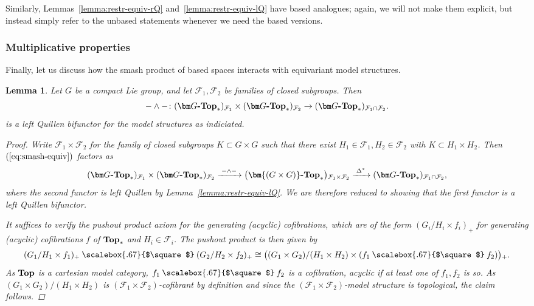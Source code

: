 \documentclass[reqno]{memo-l}
\theoremstyle{mythm}
\newtheorem{lemma}[thm]{Lemma}
\theoremstyle{definition}
\numberwithin{equation}{section}
\newcommand{\Ff}{{\mathcal{F}}}
\newcommand{\ppo}{\mathbin{\raise.25pt\hbox{\scalebox{.67}{$\square$}}}}
\newcommand{\cat}[1]{\textbf{\textup{#1}}}
\let\smashp=\wedge
\begin{document}
Similarly, Lemmas~\ref{lemma:restr-equiv-rQ} and~\ref{lemma:restr-equiv-lQ} have based analogues; again, we will not make them explicit, but instead simply refer to the unbased statements whenever we need the based versions.

\medskip
\subsubsection{Multiplicative properties} Finally, let us discuss how the smash product of based spaces interacts with equivariant model structures.

\begin{lemma}\label{lemma:smash-lQ}
    Let $G$ be a compact Lie group, and let $\Ff_1,\Ff_2$ be families of closed subgroups. Then
    \begin{equation}\label{eq:smash-equiv}
        {-}\smashp{-}\colon (\cat{$\bm G$-Top}_*)_{\Ff_1}\times(\cat{$\bm G$-Top}_*)_{\Ff_2}\to(\cat{$\bm G$-Top}_*)_{\Ff_1\cap\Ff_2}.
    \end{equation}
    is a left Quillen bifunctor for the model structures as indiciated.
    \begin{proof}
        Write $\Ff_1\times\Ff_2$ for the family of closed subgroups $K\subset G\times G$ such that there exist $H_1\in\Ff_1,H_2\in\Ff_2$ with $K\subset H_1\times H_2$. Then $(\ref{eq:smash-equiv})$ factors as
        \[
            (\cat{$\bm G$-Top}_*)_{\Ff_1}\times(\cat{$\bm G$-Top}_*)_{\Ff_2}
            \xrightarrow{\;{-}\smashp{-}\;}\big(\cat{$\bm{(G\times G)}$-Top}_*\big){}_{\Ff_1\times\Ff_2}
            \xrightarrow{\;\Delta^*\;}(\cat{$\bm G$-Top}_*)_{\Ff_1\cap\Ff_2},
        \]
        where the second functor is left Quillen by Lemma~\ref{lemma:restr-equiv-lQ}. We are therefore reduced to showing that the first functor is a left Quillen bifunctor.

        It suffices to verify the pushout product axiom for the generating (acyclic) cofibrations, which are of the form $(G_i/H_i\times f_i)_+$ for generating (acyclic) cofibrations $f$ of $\cat{Top}_*$ and $H_i\in\Ff_i$. The pushout product is then given by
        \[
            (G_1/H_1\times f_1)_+\ppo
            (G_2/H_2\times f_2)_+\cong
            \big((G_1\times G_2)/(H_1\times H_2) \times (f_1\ppo f_2)\big){}_+.
        \]
        As $\cat{Top}$ is a cartesian model category, $f_1\ppo f_2$ is a cofibration, acyclic if at least one of $f_1,f_2$ is so. As $(G_1\times G_2)/(H_1\times H_2)$ is $(\Ff_1\times\Ff_2)$-cofibrant by definition and since the $(\Ff_1\times\Ff_2)$-model structure is topological, the claim follows.
    \end{proof}
\end{lemma}
\end{document}
